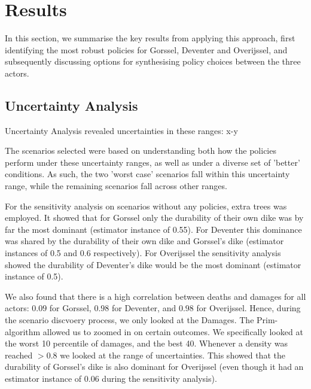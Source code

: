 \section{Results}
\label{s:results}

In this section, we summarise the key results from applying this approach, first identifying the most robust policies for Gorssel, Deventer and Overijssel, and subsequently discussing options for synthesising policy choices between the three actors. 


\subsection{Uncertainty Analysis}
Uncertainty Analysis revealed uncertainties in these ranges: x-y

The scenarios selected were based on understanding both how the policies perform under these uncertainty ranges, as well as under a diverse set of 'better' conditions. As such, the two 'worst case' scenarios fall within this uncertainty range, while the remaining scenarios fall across other ranges.


For the sensitivity analysis on scenarios without any policies, extra trees was employed. It showed that for Gorssel only the durability of their own dike was by far the most dominant (estimator instance of 0.55). For Deventer this dominance was shared by the durability of their own dike and Gorssel's dike (estimator instances of 0.5 and 0.6 respectively). For Overijssel the sensitivity analysis showed the durability of Deventer's dike would be the most dominant (estimator instance of 0.5).

We also found that there is a high correlation between deaths and damages for all actors: $0.09$ for Gorssel, $0.98$ for Deventer, and $0.98$ for Overijssel. Hence, during the scenario discvoery process, we only looked at the Damages. The Prim-algorithm allowed us to zoomed in on certain outcomes. We specifically looked at the worst 10 percentile of damages, and the best 40. Whenever a density was reached $>0.8$ we looked at the range of uncertainties. This showed that the durability of Gorssel's dike is also dominant for Overijssel (even though it had an estimator instance of 0.06 during the sensitivity analysis).


